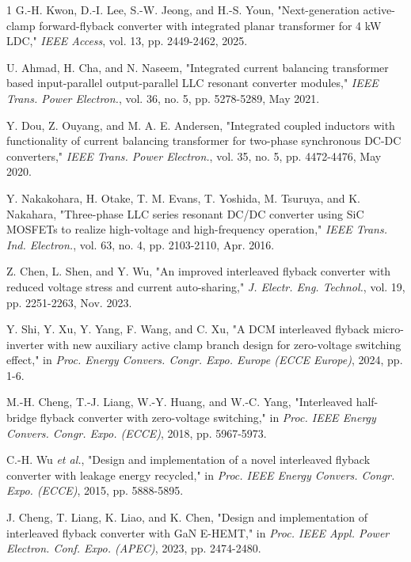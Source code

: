 \documentclass[lettersize,journal]{IEEEtran}
\begin{document}
\begin{thebibliography}{1}
{\color{red}
G.-H. Kwon, D.-I. Lee, S.-W. Jeong, and H.-S. Youn, "Next-generation active-clamp forward-flyback converter with integrated planar transformer for 4 kW LDC," \textit{IEEE Access}, vol. 13, pp. 2449-2462, 2025.}

U. Ahmad, H. Cha, and N. Naseem, "Integrated current balancing transformer based input-parallel output-parallel LLC resonant converter modules," \textit{IEEE Trans. Power Electron.}, vol. 36, no. 5, pp. 5278-5289, May 2021.

Y. Dou, Z. Ouyang, and M. A. E. Andersen, "Integrated coupled inductors with functionality of current balancing transformer for two-phase synchronous DC-DC converters," \textit{IEEE Trans. Power Electron.}, vol. 35, no. 5, pp. 4472-4476, May 2020.

Y. Nakakohara, H. Otake, T. M. Evans, T. Yoshida, M. Tsuruya, and K. Nakahara, "Three-phase LLC series resonant DC/DC converter using SiC MOSFETs to realize high-voltage and high-frequency operation," \textit{IEEE Trans. Ind. Electron.}, vol. 63, no. 4, pp. 2103-2110, Apr. 2016.

Z. Chen, L. Shen, and Y. Wu, "An improved interleaved flyback converter with reduced voltage stress and current auto-sharing," \textit{J. Electr. Eng. Technol.}, vol. 19, pp. 2251-2263, Nov. 2023.

{\color{red}
Y. Shi, Y. Xu, Y. Yang, F. Wang, and C. Xu, "A DCM interleaved flyback micro-inverter with new auxiliary active clamp branch design for zero-voltage switching effect," in \textit{Proc. Energy Convers. Congr. Expo. Europe (ECCE Europe)}, 2024, pp. 1-6.}

{\color{red}
M.-H. Cheng, T.-J. Liang, W.-Y. Huang, and W.-C. Yang, "Interleaved half-bridge flyback converter with zero-voltage switching," in \textit{Proc. IEEE Energy Convers. Congr. Expo. (ECCE)}, 2018, pp. 5967-5973.}

{\color{red}
C.-H. Wu \textit{et al.}, "Design and implementation of a novel interleaved flyback converter with leakage energy recycled," in \textit{Proc. IEEE Energy Convers. Congr. Expo. (ECCE)}, 2015, pp. 5888-5895.}

{\color{red}
J. Cheng, T. Liang, K. Liao, and K. Chen, "Design and implementation of interleaved flyback converter with GaN E-HEMT," in \textit{Proc. IEEE Appl. Power Electron. Conf. Expo. (APEC)}, 2023, pp. 2474-2480.}


\end{thebibliography}
\end{document}
